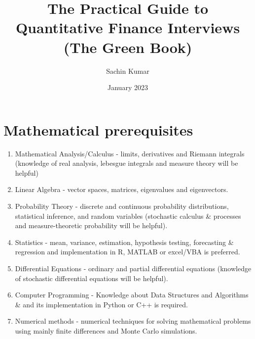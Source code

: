 \documentclass{article}
\title{The Practical Guide to Quantitative Finance Interviews \\ (The Green Book)}
\author{Sachin Kumar}
\date{January 2023}
\begin{document}
\maketitle

\section{Mathematical prerequisites}
\begin{enumerate}
    \item Mathematical Analysis/Calculus - limits, derivatives and Riemann integrals (knowledge of real analysis, lebesgue integrals and measure theory will be helpful)
    \item Linear Algebra - vector spaces, matrices, eigenvalues and eigenvectors.
    \item Probability Theory - discrete and continuous probability distributions, statistical inference, and random variables (stochastic calculus \& processes and measure-theoretic probability will be helpful).
    \item Statistics - mean, variance, estimation, hypothesis testing, forecasting \& regression and implementation in R, MATLAB or excel/VBA is preferred.
    \item Differential Equations - ordinary and partial differential equations (knowledge of stochastic differential equations will be helpful).
    \item Computer Programming - Knowledge about Data Structures and Algorithms \& and its implementation in Python or C++ is required.
    \item Numerical methods - numerical techniques for solving mathematical problems using mainly finite differences and Monte Carlo simulations.
\end{enumerate}
\end{document}
